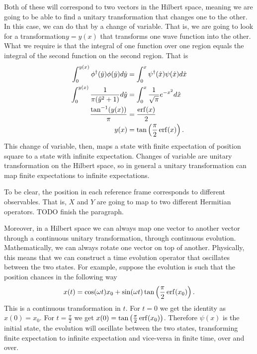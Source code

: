 Both of these will correspond to two vectors in the Hilbert space, meaning we are going to be able to find a unitary transformation that changes one to the other. In this case, we can do that by a change of variable. That is, we are going to look for a transformation$y=y(x)$ that transforms one wave function into the other. What we require is that the integral of one function over one region equals the integral of the second function on the second region. That is
\begin{equation}
	\begin{aligned}
		\int_{0}^{y(x)} \phi^\dagger(\hat{y}) \phi(\hat{y}) d\hat{y} &= \int_{0}^{x} \psi^\dagger(\hat{x}) \psi(\hat{x}) d\hat{x} \\
		\int_{0}^{y(x)} \frac{1}{\pi(\hat{y}^2 + 1)} d\hat{y} &= \int_{0}^{x} \frac{1}{\sqrt{\pi}} e^{-x^2} d\hat{x} \\
		\frac{\tan^{-1}(y(x))}{\pi} &= \frac{\operatorname{erf}(x)}{2} \\
		y(x) &= \tan \left(\frac{\pi}{2}\operatorname{erf}(x)\right).
	\end{aligned}
\end{equation}
This change of variable, then, maps a state with finite expectation of position square to a state with infinite expectation. Changes of variable are unitary transformation on the Hilbert space, so in general a unitary transformation can map finite expectations to infinite expectations.

To be clear, the position in each reference frame corresponds to different observables. That is, $X$ and $Y$ are going to map to two different Hermitian operators. TODO finish the paragraph.

Moreover, in a Hilbert space we can always map one vector to another vector through a continuous unitary transformation, through continuous evolution. Mathematically, we can always rotate one vector on top of another. Physically, this means that we can construct a time evolution operator that oscillates between the two states. For example, suppose the evolution is such that the position chances in the following way
\begin{equation}
	x(t) = \cos(\omega t) x_0 + \sin(\omega t) \tan \left(\frac{\pi}{2}\operatorname{erf}(x_0)\right).
\end{equation}
This is a continuous transformation in $t$. For $t=0$ we get the identity as $x(0) = x_0$. For $t=\frac{\pi}{2}$ we get $x(0) = \tan \left(\frac{\pi}{2}\operatorname{erf}(x_0)\right)$. Therefore $\psi(x)$ is the initial state, the evolution will oscillate between the two states, transforming finite expectation to infinite expectation and vice-versa in finite time, over and over.


